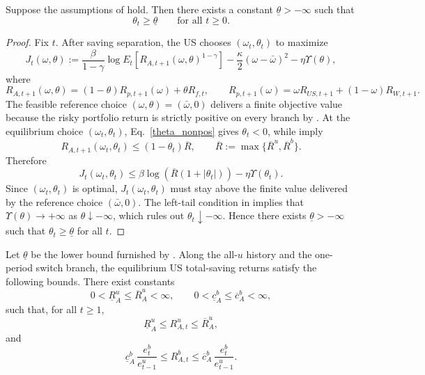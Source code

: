 \documentclass{article}
\begin{document}
\begin{lem}\label{lem_US_bond_share_lower}\label{lem2}
Suppose the assumptions of  hold. Then there exists a constant $\underline\theta> -\infty$ such that
\[
\theta_t\ge \underline\theta
\qquad\text{for all }t\ge 0.
\]
\end{lem}

\begin{proof}
Fix $t$. After saving separation, the US chooses $(\omega_t,\theta_t)$ to maximize
\[
J_t(\omega,\theta)
:=
\frac{\beta}{1-\gamma}\log E_t\!\left[R_{A,t+1}(\omega,\theta)^{1-\gamma}\right]
-\frac{\kappa}{2}(\omega-\bar\omega)^2
-\eta\Upsilon(\theta),
\]
where
\[
R_{A,t+1}(\omega,\theta)
=(1-\theta)R_{p,t+1}(\omega)+\theta R_{f,t},
\qquad
R_{p,t+1}(\omega)=\omega R_{US,t+1}+(1-\omega)R_{W,t+1}.
\]
The feasible reference choice $(\omega,\theta)=(\bar\omega,0)$ delivers a finite objective value because the risky portfolio return is strictly positive on every branch by . At the equilibrium choice $(\omega_t,\theta_t)$, Eq.~\eqref{theta_nonpos} gives $\theta_t<0$, while  imply
\[
R_{A,t+1}(\omega_t,\theta_t)
\le
(1-\theta_t)\overline R,
\qquad
\overline R:=\max\{\overline R^u,\overline R^b\}.
\]
Therefore
\[
J_t(\omega_t,\theta_t)
\le
\beta\log\!(\overline R(1+|\theta_t|))-\eta\Upsilon(\theta_t).
\]
Since $(\omega_t,\theta_t)$ is optimal, $J_t(\omega_t,\theta_t)$ must stay above the finite value delivered by the reference choice $(\bar\omega,0)$. The left-tail condition in  implies that $\Upsilon(\theta)\to+\infty$ as $\theta\downarrow -\infty$, which rules out $\theta_t\downarrow-\infty$. Hence there exists $\underline\theta>-\infty$ such that $\theta_t\ge \underline\theta$ for all $t$.
\end{proof}

\begin{ass}\label{ass_positive_total_saving_return}
Let $\underline\theta$ be the lower bound furnished by . Along the all-$u$ history and the one-period switch branch, the equilibrium US total-saving returns satisfy the following bounds. There exist constants
\[
0<\underline R_A^u\le \overline R_A^u<\infty,
\qquad
0<\underline c_A^b\le \overline c_A^b<\infty,
\]
such that, for all $t\ge 1$,
\[
\underline R_A^u\le R_{A,t}^u\le \overline R_A^u,
\]
and
\[
\underline c_A^b\,\frac{e_t^b}{e_{t-1}^u}
\le
R_{A,t}^b
\le
\overline c_A^b\,\frac{e_t^b}{e_{t-1}^u}.
\]
\end{ass}
\end{document}
